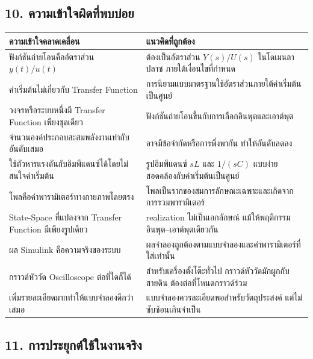 
\subsection{10. ความเข้าใจผิดที่พบบ่อย}

\begin{table}[htbp]
    \centering
    \begin{tabular}{l l}
        \hline
        \textbf{ความเข้าใจคลาดเคลื่อน} & \textbf{แนวคิดที่ถูกต้อง} \\
        \hline
        ฟังก์ชันถ่ายโอนคืออัตราส่วน $y(t)/u(t)$ & ต้องเป็นอัตราส่วน $Y(s)/U(s)$ ในโดเมนลาปลาซ ภายใต้เงื่อนไขที่กำหนด \\
        ค่าเริ่มต้นไม่เกี่ยวกับ Transfer Function & การนิยามแบบมาตรฐานใช้อัตราส่วนภายใต้ค่าเริ่มต้นเป็นศูนย์ \\
        วงจรหรือระบบหนึ่งมี Transfer Function เพียงชุดเดียว & ฟังก์ชันถ่ายโอนขึ้นกับการเลือกอินพุตและเอาต์พุต \\
        จำนวนองค์ประกอบสะสมพลังงานเท่ากับอันดับเสมอ & อาจมีข้อจำกัดหรือการพึ่งพากัน ทำให้อันดับลดลง \\
        ใช้ตัวหารแรงดันกับอิมพีแดนซ์ได้โดยไม่สนใจค่าเริ่มต้น & รูปอิมพีแดนซ์ $sL$ และ $1/(sC)$ แบบง่ายสอดคล้องกับค่าเริ่มต้นเป็นศูนย์ \\
        โพลคือค่าพารามิเตอร์ทางกายภาพโดยตรง & โพลเป็นรากของสมการลักษณะเฉพาะและเกิดจากการรวมพารามิเตอร์ \\
        State-Space ที่แปลงจาก Transfer Function มีเพียงรูปเดียว & realization ไม่เป็นเอกลักษณ์ แม้ให้พฤติกรรมอินพุต–เอาต์พุตเดียวกัน \\
        ผล Simulink คือความจริงของระบบ & ผลจำลองถูกต้องตามแบบจำลองและค่าพารามิเตอร์ที่ใส่เท่านั้น \\
        กราวด์หัววัด Oscilloscope ต่อที่ใดก็ได้ & สำหรับเครื่องตั้งโต๊ะทั่วไป กราวด์หัววัดมักผูกกับสายดิน ต้องต่อที่โหนดกราวด์ร่วม \\
        เพิ่มรายละเอียดมากทำให้แบบจำลองดีกว่าเสมอ & แบบจำลองควรละเอียดพอสำหรับวัตถุประสงค์ แต่ไม่ซับซ้อนเกินจำเป็น \\
        \hline
    \end{tabular}
\end{table}


\subsection{11. การประยุกต์ใช้ในงานจริง}

